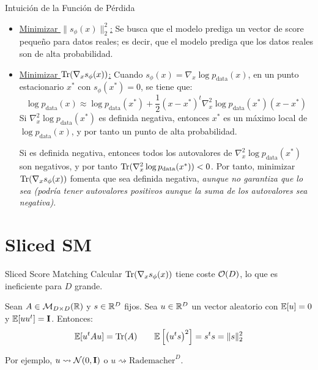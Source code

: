 \documentclass{beamer}
\begin{document}
\begin{frame}{Intuición de la Función de Pérdida}
    \begin{itemize}
        \item \ul{Minimizar $\|s_\phi(x)\|_2^2$:} Se busca que el modelo prediga un vector de score pequeño para datos reales; es decir, que el modelo prediga que los datos reales son de alta probabilidad.\pause
        \item \ul{Minimizar $\operatorname{Tr}(\nabla_x s_\phi(x))$:} Cuando $s_\phi(x)=\nabla_x \log p_\text{data}(x)$, en un punto estacionario $x^*$ con $s_\phi(x^*)=0$, se tiene que:
        \begin{equation*}
            \log p_\text{data}(x) \approx \log p_\text{data}(x^*) + \frac{1}{2}(x-x^*)^t \nabla_x^2 \log p_\text{data}(x^*) (x-x^*)
        \end{equation*}
        \pause
        Si $\nabla_x^2 \log p_\text{data}(x^*)$ es definida negativa, entonces $x^*$ es un máximo local de $\log p_\text{data}(x)$, y por tanto un punto de alta probabilidad.\pause

        Si es definida negativa, entonces todos los autovalores de $\nabla_x^2 \log p_\text{data}(x^*)$ son negativos, y por tanto $\operatorname{Tr}(\nabla_x^2 \log p_\text{data}(x^*)) < 0$. Por tanto, minimizar $\operatorname{Tr}(\nabla_x s_\phi(x))$ fomenta que sea definida negativa, \emph{aunque no garantiza que lo sea (podría tener autovalores positivos aunque la suma de los autovalores sea negativa)}.

    \end{itemize}
\end{frame}


\section{Sliced SM}
\begin{frame}{Sliced Score Matching}
    Calcular $\operatorname{Tr}(\nabla_x s_\phi(x))$ tiene coste $\mathcal{O}(D)$, lo que es ineficiente para $D$ grande. \pause
    \begin{proposition}
        Sean $A\in \mathcal{M}_{D\times D}(\mathbb{R})$ y $s\in \mathbb{R}^D$ fijos. Sea $u\in \mathbb{R}^D$ un vector aleatorio con $\mathbb{E}[u]=0$ y $\mathbb{E}[uu^t] = \mathbf{I}$. Entonces:
        \begin{equation*}
            \mathbb{E}[u^t A u] = \operatorname{Tr}(A)\qquad \mathbb{E}\left[\left(u^ts\right)^2\right] = s^t s = \|s\|_2^2
        \end{equation*}\pause
    \end{proposition}
    Por ejemplo, $u\rightsquigarrow \mathcal{N}(0, \mathbf{I})$ o $u\rightsquigarrow \text{Rademacher}^D$.
\end{frame}
\end{document}
